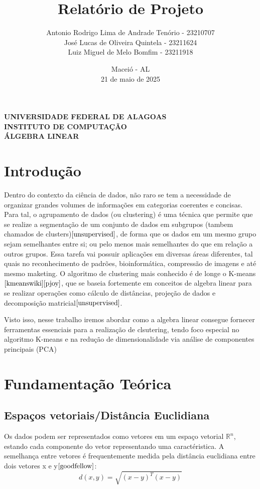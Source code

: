\documentclass[a4paper,12pt]{article}
\title{Relatório de Projeto}
\author{
    Antonio Rodrigo Lima de Andrade Tenório - 23210707 \\
    José Lucas de Oliveira Quintela - 23211624\\
    Luiz Miguel de Melo Bomfim - 23211918
}
\date{Maceió - AL \\ 21 de maio de 2025}
\begin{document}
\maketitle

\begin{center}
    \textbf{UNIVERSIDADE FEDERAL DE ALAGOAS} \\
    \textbf{INSTITUTO DE COMPUTAÇÃO} \\
    \textbf{ÁLGEBRA LINEAR}
\end{center}

\thispagestyle{empty}
\newpage

\tableofcontents
\newpage

\section{Introdução}

Dentro do contexto da ciência de dados, não raro se tem a necessidade de organizar grandes volumes de informações em categorias coerentes e concisas. Para tal, o agrupamento de dados (ou clustering) é uma técnica que permite que se realize a segmentação de um conjunto de dados em subgrupos (tambem chamados de clusters)$\cite{unsupervised}$, de forma que os dados em um mesmo grupo sejam semelhantes entre si; ou pelo menos mais semelhantes do que em relação a outros grupos. Essa tarefa vai possuir aplicações em diversas áreas diferentes, tal quais no reconhecimento de padrões, bioinformática, compressão de imagens e até mesmo maketing. O algoritmo de clustering mais conhecido é de longe o K-means$\cite{kmeanswiki}\cite{pjoy}$, que se baseia fortemente em conceitos de algebra linear para se realizar operações como cálculo de distâncias, projeção de dados e decomposição matricial$\cite{unsupervised}$.

Visto isso, nesse trabalho iremos abordar como a algebra linear consegue fornecer ferramentas essenciais para a realização de clsutering, tendo foco especial no algoritmo K-means e na redução de dimensionalidade via análise de componentes principais (PCA)

\section{Fundamentação Teórica}

\subsection{Espaços vetoriais/Distância Euclidiana}
Os dados podem ser representados como vetores em um espaço vetorial $\mathbb{R}^n$, estando cada componente do vetor representando uma caractéristica. A semelhança entre vetores é frequentemente medida pela distância euclidiana entre dois vetores x e y$\cite{goodfellow}$: \begin{equation}
d(x, y) = \sqrt{(x - y)^T (x - y)}
\end{equation}
\end{document}
